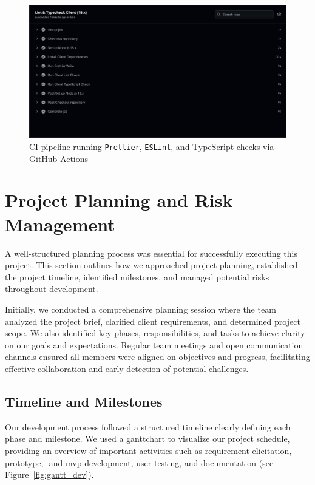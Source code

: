 \begin{figure}[H]
    \centering
    \includegraphics[width=1\linewidth]{figures/lint_typecheck_ci.png}
    \caption{CI pipeline running \texttt{Prettier}, \texttt{ESLint}, and TypeScript checks via GitHub Actions}
    \label{fig:lint_typecheck_ci}
\end{figure}

\section{Project Planning and Risk Management}
\label{sec:project_planning_risk}
A well-structured planning process was essential for successfully executing this project. This section outlines how we approached project planning, established the project timeline, identified milestones, and managed potential risks throughout development.

Initially, we conducted a comprehensive planning session where the team analyzed the project brief, clarified client requirements, and determined project scope. We also identified key phases, responsibilities, and tasks to achieve clarity on our goals and expectations. Regular team meetings and open communication channels ensured all members were aligned on objectives and progress, facilitating effective collaboration and early detection of potential challenges.

\subsection{Timeline and Milestones}
\label{subsec:timeline_milestones}
Our development process followed a structured timeline clearly defining each phase and milestone. We used a \gls{ganttchart} to visualize our project schedule, providing an overview of important activities such as requirement elicitation, prototype,- and \acrshort{mvp} development, user testing, and documentation (see Figure~\ref{fig:gantt_dev}).

